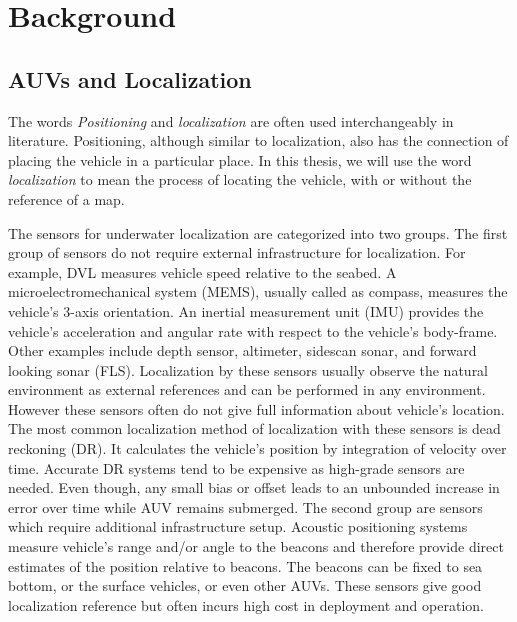 
\chapter{Background}
\label{ch:background}


\section{AUVs and Localization}

The words \textit{Positioning} and \textit{localization} are often used interchangeably in literature. Positioning, although similar to localization, also has the connection of placing the vehicle in a particular place. In this thesis, we will use the word \textit{localization} to mean the process of locating the vehicle, with or without the reference of a map.

The sensors for underwater localization are categorized into two groups. The first group of sensors do not require external infrastructure for localization. For example, DVL measures vehicle speed relative to the seabed. A microelectromechanical system (MEMS), usually called as compass, measures the vehicle's 3-axis orientation. An inertial measurement unit (IMU) provides the vehicle's acceleration and angular rate with respect to the vehicle's body-frame. Other examples include depth sensor, altimeter, sidescan sonar, and forward looking sonar (FLS). Localization by these sensors usually observe the natural environment as external references and can be performed in any environment. However these sensors often do not give full information about vehicle's location. The most common localization method of localization with these sensors is dead reckoning (DR). It calculates the vehicle's position by integration of velocity over time. Accurate DR systems tend to be expensive as high-grade sensors are needed. Even though, any small bias or offset leads to an unbounded increase in error over time while AUV remains submerged. The second group are sensors which require additional infrastructure setup. Acoustic positioning systems measure vehicle's range and/or angle to the beacons and therefore provide direct estimates of the position relative to beacons. The beacons can be fixed to sea bottom, or the surface vehicles, or even other AUVs. These sensors give good localization reference but often incurs high cost in deployment and operation.

